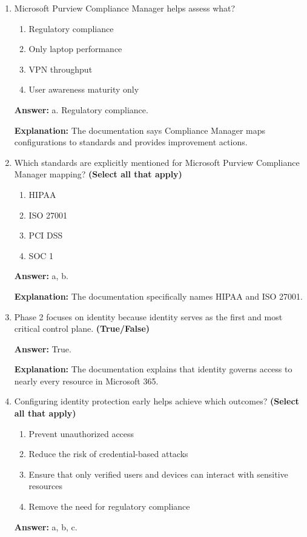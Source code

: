 \documentclass[10pt]{article}
\begin{document}
\begin{enumerate}[leftmargin=*]
\textbf{Explanation:} These are the specific recommendations listed in the documentation.

\item Microsoft Purview Compliance Manager helps assess what?
\begin{enumerate}[label=\alph*., leftmargin=1.5em]
\item Regulatory compliance
\item Only laptop performance
\item VPN throughput
\item User awareness maturity only
\end{enumerate}
\textbf{Answer:} a. Regulatory compliance.

\textbf{Explanation:} The documentation says Compliance Manager maps configurations to standards and provides improvement actions.

\item Which standards are explicitly mentioned for Microsoft Purview Compliance Manager mapping? \textbf{(Select all that apply)}
\begin{enumerate}[label=\alph*., leftmargin=1.5em]
\item HIPAA
\item ISO 27001
\item PCI DSS
\item SOC 1
\end{enumerate}
\textbf{Answer:} a, b.

\textbf{Explanation:} The documentation specifically names HIPAA and ISO 27001.

\item Phase 2 focuses on identity because identity serves as the first and most critical control plane. \textbf{(True/False)}

\textbf{Answer:} True.

\textbf{Explanation:} The documentation explains that identity governs access to nearly every resource in Microsoft 365.

\item Configuring identity protection early helps achieve which outcomes? \textbf{(Select all that apply)}
\begin{enumerate}[label=\alph*., leftmargin=1.5em]
\item Prevent unauthorized access
\item Reduce the risk of credential-based attacks
\item Ensure that only verified users and devices can interact with sensitive resources
\item Remove the need for regulatory compliance
\end{enumerate}
\textbf{Answer:} a, b, c.


\end{enumerate}
\end{document}
